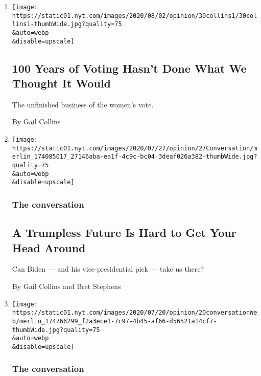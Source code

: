 \begin{enumerate}
\def\labelenumi{\arabic{enumi}.}
\item
  \href{/2020/07/30/opinion/sunday/19th-amendment-women-suffrage.html}{}

  \texttt{[image: https://static01.nyt.com/images/2020/08/02/opinion/30collins1/30collins1-thumbWide.jpg?quality=75\\\&auto=webp\\\&disable=upscale]}

  \hypertarget{100-years-of-voting-hasnt-done-what-we-thought-it-would}{%
  \subsection{100 Years of Voting Hasn't Done What We Thought It
  Would}\label{100-years-of-voting-hasnt-done-what-we-thought-it-would}}

  The unfinished business of the women's vote.

  By Gail Collins
\item
  \href{/2020/07/27/opinion/biden-trump-2020-vp.html}{}

  \texttt{[image: https://static01.nyt.com/images/2020/07/27/opinion/27Conversation/merlin\_174085017\_27146aba-ea1f-4c9c-bc04-3deaf026a382-thumbWide.jpg?quality=75\\\&auto=webp\\\&disable=upscale]}

  \hypertarget{the-conversation}{%
  \subsubsection{The conversation}\label{the-conversation}}

  \hypertarget{a-trumpless-future-is-hard-to-get-your-head-around}{%
  \subsection{A Trumpless Future Is Hard to Get Your Head
  Around}\label{a-trumpless-future-is-hard-to-get-your-head-around}}

  Can Biden --- and his vice-presidential pick --- take us there?

  By Gail Collins and Bret Stephens
\item
  \href{/2020/07/21/opinion/trump-portland-coronavirus.html}{}

  \texttt{[image: https://static01.nyt.com/images/2020/07/20/opinion/20conversationWeb/merlin\_174766299\_f2a3ece1-7c97-4b45-af66-d56521a14cf7-thumbWide.jpg?quality=75\\\&auto=webp\\\&disable=upscale]}

  \hypertarget{the-conversation-1}{%
  \subsubsection{The conversation}\label{the-conversation-1}}


\end{enumerate}
